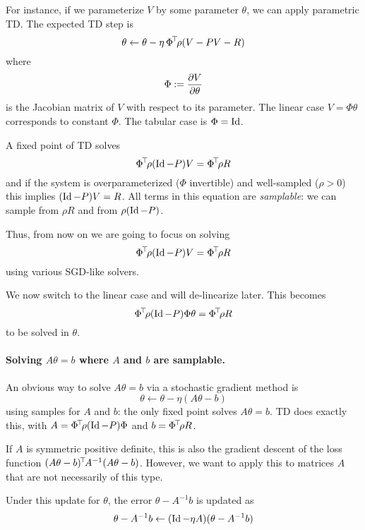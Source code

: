 \documentclass[11pt,a4paper]{article}
\begin{document}
For instance, if we parameterize $V$ by some parameter $\theta$, we can apply
parametric TD. The expected TD step is
\begin{equation}
\theta\gets \theta -\eta \,\Phi^{\!\top}\!\rho (V-PV-R)
\end{equation}
where 
\begin{equation}
\Phi\mathrel{\mathop{:}}= \frac{\partial V}{\partial \theta}
\end{equation}
is the Jacobian matrix of $V$ with respect to its parameter. The linear
case $V=\Phi \theta$ corresponds to constant $\Phi$. The tabular case is
$\Phi=\operatorname{Id}$.

A fixed point of TD solves
\begin{equation}
\Phi^{\!\top}\!\rho(\operatorname{Id}-P)V=\Phi^{\!\top}\!\rho R
\end{equation}
and if the system is overparameterized ($\Phi$ invertible) and
well-sampled ($\rho>0$) this implies $(\operatorname{Id}-P)V=R$. All terms in this
equation are \emph{samplable}: we can sample from $\rho R$ and from
$\rho(\operatorname{Id}-P)$.


Thus, from now on we are going to focus on solving
\begin{equation}
\Phi^{\!\top}\!\rho (\operatorname{Id}-P)V=\Phi^{\!\top}\!\rho R
\end{equation}
using various SGD-like solvers.

We now switch to the linear case and will de-linearize later. This
becomes
\begin{equation}
\Phi^{\!\top}\!\rho (\operatorname{Id}-P)\Phi \theta=\Phi^{\!\top}\!\rho R
\end{equation}
to be solved in $\theta$.

\paragraph{Solving $A\theta=b$ where $A$ and $b$ are samplable.} An
obvious way to solve $A\theta=b$ via a stochastic gradient method is
\begin{equation}
\theta\gets \theta - \eta (A\theta-b)
\end{equation}
using samples for $A$ and $b$: the only fixed point solves $A\theta=b$.
TD does exactly this, 
with $A=\Phi^{\!\top}\!\rho(\operatorname{Id}-P)\Phi$ and $b=\Phi^{\!\top}\!\rho R$.

If $A$ is symmetric positive definite, this is also the
gradient descent of the loss function
$(A\theta-b)^{\!\top}\!A^{-1}(A\theta-b)$. However, we want to apply this
to matrices $A$ that are not necessarily of this type.

Under this update for $\theta$, the error $\theta-A^{-1}b$ is updated as
\begin{equation}
\theta-A^{-1}b \gets (\operatorname{Id}-\eta A)(\theta-A^{-1}b)
\end{equation}
\end{document}

